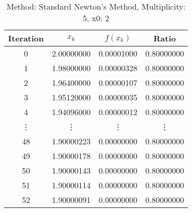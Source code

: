 \begin{table}
\centering
\caption{Method: Standard Newton's Method, Multiplicity: 5, x0: 2}
\label{tab:table_Standard_Newton's_Method_5_2}
\begin{tabular}{c c c c}
\toprule
Iteration &      $x_k$ &   $f(x_k)$ &      Ratio \\
\midrule
        0 & 2.00000000 & 0.00001000 & 0.80000000 \\
        1 & 1.98000000 & 0.00000328 & 0.80000000 \\
        2 & 1.96400000 & 0.00000107 & 0.80000000 \\
        3 & 1.95120000 & 0.00000035 & 0.80000000 \\
        4 & 1.94096000 & 0.00000012 & 0.80000000 \\
   \vdots &     \vdots &     \vdots &     \vdots \\
       48 & 1.90000223 & 0.00000000 & 0.80000000 \\
       49 & 1.90000178 & 0.00000000 & 0.80000000 \\
       50 & 1.90000143 & 0.00000000 & 0.80000000 \\
       51 & 1.90000114 & 0.00000000 & 0.80000000 \\
       52 & 1.90000091 & 0.00000000 & 0.80000000 \\
\bottomrule
\end{tabular}
\end{table}
